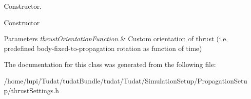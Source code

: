 Constructor. 

Constructor 
\begin{DoxyParams}{Parameters}
{\em thrust\+Orientation\+Function} & Custom orientation of thrust (i.\+e. predefined body-\/fixed-\/to-\/propagation rotation as function of time) \\
\hline
\end{DoxyParams}


The documentation for this class was generated from the following file\+:\begin{DoxyCompactItemize}
\item 
/home/lupi/\+Tudat/tudat\+Bundle/tudat/\+Tudat/\+Simulation\+Setup/\+Propagation\+Setup/thrust\+Settings.\+h\end{DoxyCompactItemize}
